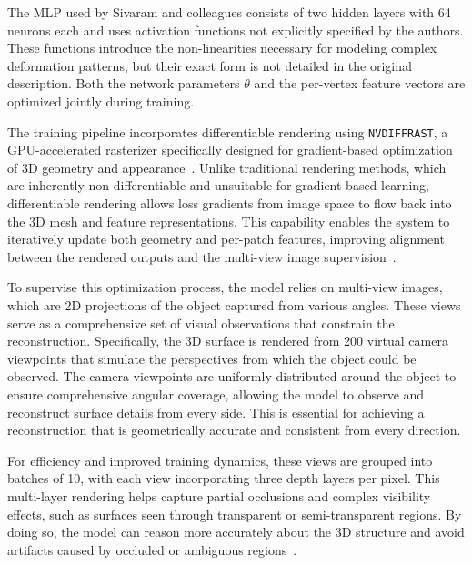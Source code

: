 The MLP used by Sivaram and colleagues consists of two hidden layers with 64 neurons each and uses activation functions not explicitly specified by the authors.  
These functions introduce the non-linearities necessary for modeling complex deformation patterns, but their exact form is not detailed in the original description.  
Both the network parameters $\theta$ and the per-vertex feature vectors are optimized jointly during training.  

The training pipeline incorporates differentiable rendering using \texttt{NVDIFFRAST}, a GPU-accelerated rasterizer specifically designed for gradient-based optimization of 3D geometry and appearance~\cite{niemeyer2020}.  
Unlike traditional rendering methods, which are inherently non-differentiable and unsuitable for gradient-based learning, differentiable rendering allows loss gradients from image space to flow back into the 3D mesh and feature representations.  
This capability enables the system to iteratively update both geometry and per-patch features, improving alignment between the rendered outputs and the multi-view image supervision~\cite{kato2020}.  

To supervise this optimization process, the model relies on multi-view images, which are 2D projections of the object captured from various angles.  
These views serve as a comprehensive set of visual observations that constrain the reconstruction.  
Specifically, the 3D surface is rendered from 200 virtual camera viewpoints that simulate the perspectives from which the object could be observed.  
The camera viewpoints are uniformly distributed around the object to ensure comprehensive angular coverage, allowing the model to observe and reconstruct surface details from every side.  
This is essential for achieving a reconstruction that is geometrically accurate and consistent from every direction.  

For efficiency and improved training dynamics, these views are grouped into batches of 10, with each view incorporating three depth layers per pixel.  
This multi-layer rendering helps capture partial occlusions and complex visibility effects, such as surfaces seen through transparent or semi-transparent regions.  
By doing so, the model can reason more accurately about the 3D structure and avoid artifacts caused by occluded or ambiguous regions~\cite{burggraaff2018}.  


